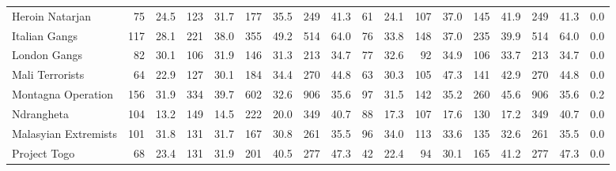 \begin{tabular}{lrrrrrrrrrrrrrrrrl}
Heroin Natarjan      &                75 &  24.5 &  123 &  31.7 &  177 &  35.5 &  249 &  41.3 &               61 &   24.1 &  107 &   37.0 &  145 &   41.9 &  249 &  41.3 &        0.0 \\
Italian Gangs        &               117 &  28.1 &  221 &  38.0 &  355 &  49.2 &  514 &  64.0 &               76 &   33.8 &  148 &   37.0 &  235 &   39.9 &  514 &  64.0 &        0.0 \\
London Gangs         &                82 &  30.1 &  106 &  31.9 &  146 &  31.3 &  213 &  34.7 &               77 &   32.6 &   92 &   34.9 &  106 &   33.7 &  213 &  34.7 &        0.0 \\
Mali Terrorists      &                64 &  22.9 &  127 &  30.1 &  184 &  34.4 &  270 &  44.8 &               63 &   30.3 &  105 &   47.3 &  141 &   42.9 &  270 &  44.8 &        0.0 \\
Montagna Operation   &               156 &  31.9 &  334 &  39.7 &  602 &  32.6 &  906 &  35.6 &               97 &   31.5 &  142 &   35.2 &  260 &   45.6 &  906 &  35.6 &        0.2 \\
Ndrangheta           &               104 &  13.2 &  149 &  14.5 &  222 &  20.0 &  349 &  40.7 &               88 &   17.3 &  107 &   17.6 &  130 &   17.2 &  349 &  40.7 &        0.0 \\
Malasyian Extremists &               101 &  31.8 &  131 &  31.7 &  167 &  30.8 &  261 &  35.5 &               96 &   34.0 &  113 &   33.6 &  135 &   32.6 &  261 &  35.5 &        0.0 \\
Project Togo         &                68 &  23.4 &  131 &  31.9 &  201 &  40.5 &  277 &  47.3 &               42 &   22.4 &   94 &   30.1 &  165 &   41.2 &  277 &  47.3 &        0.0 \\
\bottomrule
\end{tabular}
